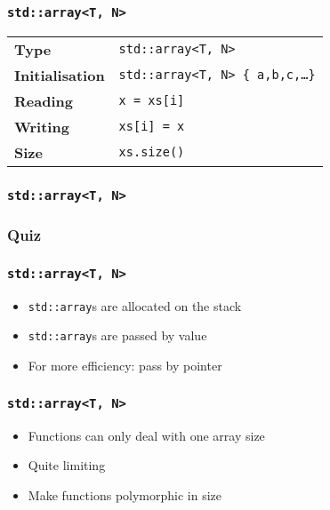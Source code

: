 \documentclass{../ucll-slides}
\begin{document}
\begin{frame}
  \frametitle{\tt std::array<T, N>}
  \begin{center}
    \begin{tabular}{ll}
      \bf Type & {\tt std::array<T, N>} \\[2mm]
      \bf Initialisation & {\tt std::array<T, N> \{ a,b,c,\dots \}} \\[2mm]
      \bf Reading & {\tt x = xs[i]} \\[2mm]
      \bf Writing & {\tt xs[i] = x} \\[2mm]
      \bf Size & {\tt xs.size()} \\
    \end{tabular}
  \end{center}
\end{frame}

\begin{frame}
  \frametitle{\tt std::array<T, N>}
\end{frame}

\begin{frame}
  \frametitle{Quiz}
\end{frame}

\begin{frame}
  \frametitle{\tt std::array<T, N>}
  \begin{itemize}
    \item {\tt std::array}s are allocated on the stack
    \item {\tt std::array}s are passed by value
    \item For more efficiency: pass by pointer
  \end{itemize}
\end{frame}

\begin{frame}
  \frametitle{\tt std::array<T, N>}
  \begin{itemize}
    \item Functions can only deal with one array size
    \item Quite limiting
    \item Make functions polymorphic in size
  \end{itemize}
\end{frame}
\end{document}
